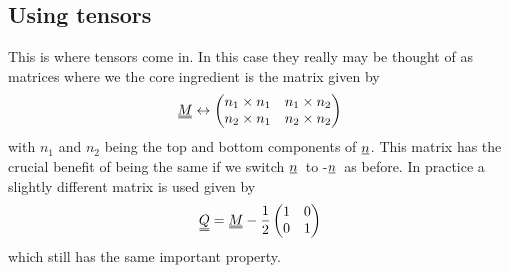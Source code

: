 \documentclass[a4paper,11pt]{article}
\newcommand{\suf}[2]{\stackunder[0.5pt]{\stackunder[1pt]{\ensuremath{#1}}{\rule{\widthof{\ensuremath{#2}}*\real{0.9}}{.1ex}}}{}}
\newcommand{\duf}[2]{\stackunder[0.5pt]{\stackunder[0.8pt]{\stackunder[1pt]{\ensuremath{#1}}{\rule{\widthof{\ensuremath{#2}}*\real{0.9}}{.1ex}}}{\rule{\widthof{\ensuremath{#2}}*\real{0.9}}{.1ex}}}{}}
\newcommand{\su}[1]{\suf{#1}{#1}}
\newcommand{\du}[1]{\duf{#1}{#1}}
\newcommand{\nn}{\ensuremath{\su{n}}}
\begin{document}
\begin{multicols}{2}
    \subsection*{Using tensors}
    This is where tensors come in.
    In this case they really may be thought of as matrices where we the core ingredient is the matrix given by
    \begin{equation*}
        \du{M} \leftrightarrow \begin{pmatrix}
            n_1\times n_1 & n_1\times n_2 \\ n_2\times n_1 & n_2\times n_2
        \end{pmatrix}
    \end{equation*}
    with $n_1$ and $n_2$ being the top and bottom components of \nn.
    This matrix has the crucial benefit of being the same if we switch \nn\ to -\nn\ as before.
    In practice a slightly different matrix is used given by
    \begin{equation}\label{eq:kaka}
        \du{Q} = \du{M} - \frac{1}{2}\begin{pmatrix} 1 & 0 \\ 0 & 1 \end{pmatrix}
    \end{equation}
    which still has the same important property.


\end{multicols}
\end{document}
